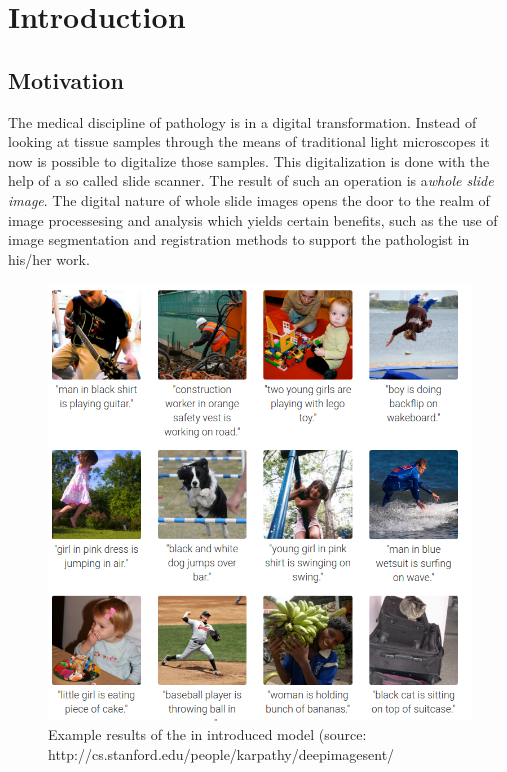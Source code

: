 \chapter{Introduction}

\section{Motivation}

The medical discipline of pathology is in a digital transformation. Instead of looking at tissue samples through the means of traditional light microscopes it now is possible to digitalize those samples. This digitalization is done with the help of a so called slide scanner. The result of such an operation is a\emph{whole slide image}\cite{Cornish13}. The digital nature of whole slide images opens the door to the realm of image processesing and analysis which yields certain benefits, such as the use of image segmentation and registration methods to support the pathologist in his/her work.

\begin{figure}[ht]
	\begin{center}
		\includegraphics[scale=0.3]{img/deepVisual.png}
		\caption{Example results of the in \cite{Karpathy15} introduced model (source: http://cs.stanford.edu/people/karpathy/deepimagesent/}
		\label{fig:fig1.1}
	\end{center}
\end{figure}

